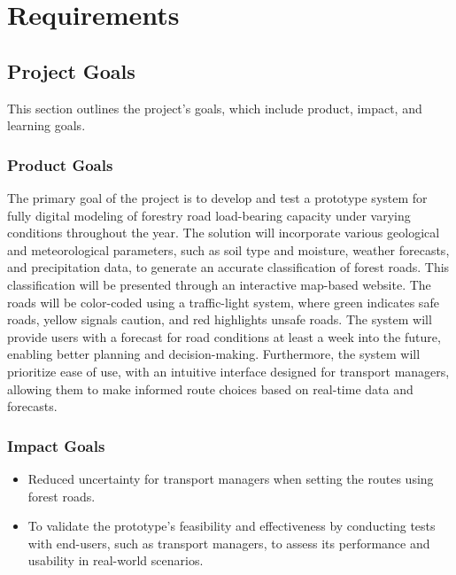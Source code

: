 \chapter{Requirements}


\section{Project Goals}
This section outlines the project's goals, which include product, impact, and learning goals.

\subsection{Product Goals}
The primary goal of the project is to develop and test a prototype system for fully digital modeling of forestry road load-bearing capacity under varying conditions throughout the year. The solution will incorporate various geological and meteorological parameters, such as soil type and moisture, weather forecasts, and precipitation data, to generate an accurate classification of forest roads. This classification will be presented through an interactive map-based website. The roads will be color-coded using a traffic-light system, where green indicates safe roads, yellow signals caution, and red highlights unsafe roads. The system will provide users with a forecast for road conditions at least a week into the future, enabling better planning and decision-making. Furthermore, the system will prioritize ease of use, with an intuitive interface designed for transport managers, allowing them to make informed route choices based on real-time data and forecasts. 

\subsection{Impact Goals}
\begin{itemize}
    \item Reduced uncertainty for transport managers when setting the routes using forest roads.
    \item To validate the prototype's feasibility and effectiveness by conducting tests with end-users, such as transport managers, to assess its performance and usability in real-world scenarios.
\end{itemize}

